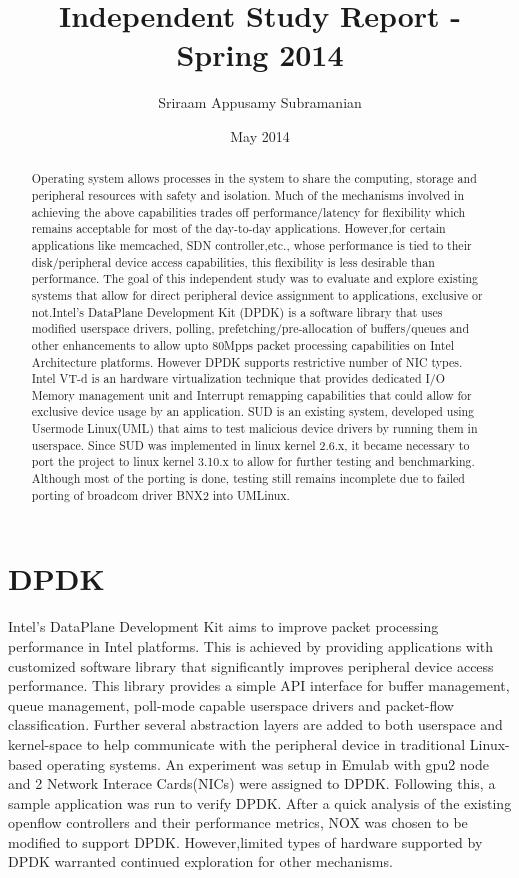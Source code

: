 \documentclass[12pt,titlepage,a4paper]{article}
\begin{document}
\title{Independent Study Report - Spring 2014}
\author{Sriraam Appusamy Subramanian}
\date{May 2014}
\maketitle

\begin{abstract}
Operating system allows processes in the system to share the computing, storage and peripheral resources with safety and isolation. Much of the mechanisms involved in achieving the above capabilities trades off performance/latency for flexibility which remains acceptable for most of the day-to-day applications. However,for certain applications like memcached, SDN controller,etc., whose performance is tied to their disk/peripheral device access capabilities, this flexibility is less desirable than performance. The goal of this independent study was to evaluate and explore existing systems that allow for direct peripheral device assignment to applications, exclusive or not.Intel's DataPlane Development Kit (DPDK) is a software library that uses modified userspace drivers, polling, prefetching/pre-allocation of buffers/queues and other enhancements to allow upto 80Mpps packet processing capabilities on Intel Architecture platforms. However DPDK supports restrictive number of NIC types.  Intel VT-d is an hardware virtualization technique that provides dedicated I/O Memory management unit and Interrupt remapping capabilities that could allow for exclusive device usage by an application. SUD is an existing system, developed using Usermode Linux(UML) that aims to test malicious device drivers by running them in userspace. Since SUD was implemented in linux kernel 2.6.x, it became necessary to port the project to linux kernel 3.10.x to allow for further testing and benchmarking. Although most of the porting is done, testing still remains incomplete due to failed porting of broadcom driver BNX2 into UMLinux. 
\end{abstract}

\section{DPDK}
Intel's DataPlane Development Kit aims to improve packet processing performance in Intel platforms. This is achieved by providing applications with customized software library that significantly improves peripheral device access performance. This library provides a simple API interface for buffer management, queue management, poll-mode capable userspace drivers and packet-flow classification. Further several abstraction layers are added to both userspace and kernel-space to help communicate with the peripheral device in traditional Linux-based operating systems. An experiment was setup in Emulab with gpu2 node and 2 Network Interace Cards(NICs) were assigned to DPDK. Following this, a sample application was run to verify DPDK. After a quick analysis of the existing openflow controllers and their performance metrics, NOX was chosen to be modified to support DPDK. However,limited types of hardware supported by DPDK warranted continued exploration for other mechanisms.
\end{document}
